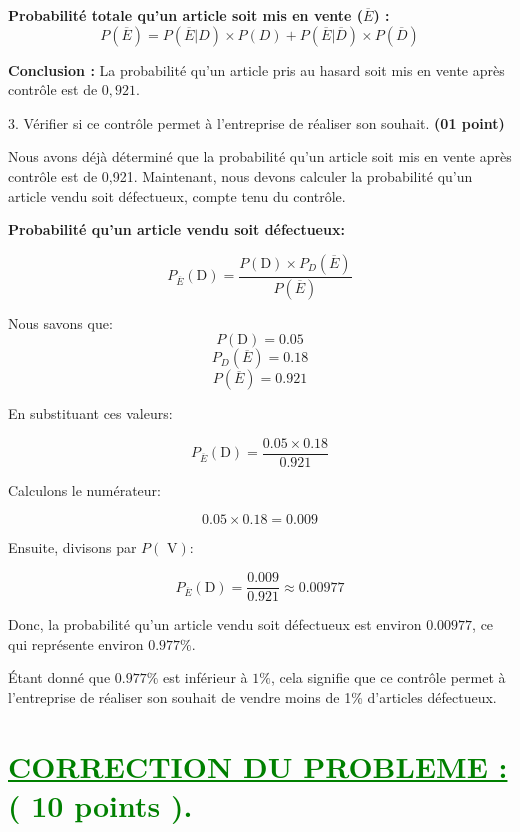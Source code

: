 \documentclass[12pt]{article}
\begin{document}
\textbf{Probabilité totale qu'un article soit mis en vente (\(\overline{E}\)) :}
\[
P(\overline{E}) = P(\overline{E}|D) \times P(D) + P(\overline{E}|\overline{D}) \times P(\overline{D})
\]



\begin{center}
\textcolor{green}{}
\end{center}

\textbf{Conclusion :} La probabilité qu'un article pris au hasard soit mis en vente après contrôle est de \(0,921\).

3. Vérifier si ce contrôle permet à l’entreprise de réaliser son souhait. \textbf{(01 point)}
    
    Nous avons déjà déterminé que la probabilité qu'un article soit mis en vente après contrôle est de 0,921. Maintenant, nous devons calculer la probabilité qu'un article vendu soit défectueux, compte tenu du contrôle.

    \textbf{Probabilité qu'un article vendu soit défectueux:}

    \[
    P_{\overline{E}}(\text{D}) = \frac{P(\text{D}) \times P_{D}(\overline{E})}{P(\overline{E})}
    \]

    Nous savons que:
    \[
    P(\text{D}) = 0.05
    \]
    \[
    P_{D}(\overline{E}) = 0.18
    \]
    \[
    P(\overline{E}) = 0.921
    \]

    En substituant ces valeurs:

    \[
    P_{\overline{E}}(\text{D}) = \frac{0.05 \times 0.18}{0.921}
    \]

    Calculons le numérateur:

    \[
    0.05 \times 0.18 = 0.009
    \]

    Ensuite, divisons par \(P(\text{ V})\):

    \[
    P_{\overline{E}}(\text{D}) = \frac{0.009}{0.921} \approx 0.00977
    \]

    Donc, la probabilité qu'un article vendu soit défectueux est environ \(0.00977\), ce qui représente environ \(0.977\%\).

    Étant donné que \(0.977\%\) est inférieur à \(1\%\), cela signifie que ce contrôle permet à l'entreprise de réaliser son souhait de vendre moins de 1\% d'articles défectueux.
\section*{\textcolor{green}{\underline{CORRECTION DU PROBLEME :} ( 10 points ).}}
\end{document}
